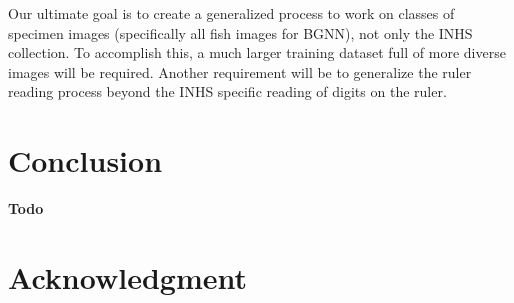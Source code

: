 \documentclass[conference]{IEEEtran}
\begin{document}
Our ultimate goal is to create a generalized process to work on classes of specimen images (specifically all fish images for BGNN), not only the INHS collection. To accomplish this, a much larger training dataset full of more diverse images will be required. Another requirement will be to generalize the ruler reading process beyond the INHS specific reading of digits on the ruler.
\section{Conclusion}
\textbf{Todo}

\section*{Acknowledgment}



\end{document}
